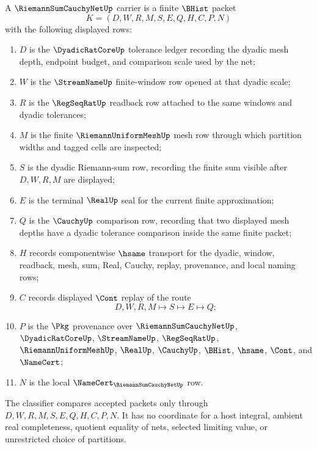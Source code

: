 \begin{definition}
\label{def:riemann-sum-cauchy-net-carrier}
A $\RiemannSumCauchyNetUp$ carrier is a finite $\BHist$ packet
$$
K=(D,W,R,M,S,E,Q,H,C,P,N)
$$
with the following displayed rows:
\begin{enumerate}
\item $D$ is the $\DyadicRatCoreUp$ tolerance ledger recording the dyadic mesh depth, endpoint budget, and comparison scale used by the net;
\item $W$ is the $\StreamNameUp$ finite-window row opened at that dyadic scale;
\item $R$ is the $\RegSeqRatUp$ readback row attached to the same windows and dyadic tolerances;
\item $M$ is the finite $\RiemannUniformMeshUp$ mesh row through which partition widths and tagged cells are inspected;
\item $S$ is the dyadic Riemann-sum row, recording the finite sum visible after $D,W,R,M$ are displayed;
\item $E$ is the terminal $\RealUp$ seal for the current finite approximation;
\item $Q$ is the $\CauchyUp$ comparison row, recording that two displayed mesh depths have a dyadic tolerance comparison inside the same finite packet;
\item $H$ records componentwise $\hsame$ transport for the dyadic, window, readback, mesh, sum, Real, Cauchy, replay, provenance, and local naming rows;
\item $C$ records displayed $\Cont$ replay of the route
$$
D,W,R,M \longmapsto S \longmapsto E \longmapsto Q ;
$$
\item $P$ is the $\Pkg$ provenance over $\RiemannSumCauchyNetUp$, $\DyadicRatCoreUp$, $\StreamNameUp$, $\RegSeqRatUp$, $\RiemannUniformMeshUp$, $\RealUp$, $\CauchyUp$, $\BHist$, $\hsame$, $\Cont$, and $\NameCert$;
\item $N$ is the local $\NameCert_{\RiemannSumCauchyNetUp}$ row.
\end{enumerate}
The classifier compares accepted packets only through $D,W,R,M,S,E,Q,H,C,P,N$. It has no coordinate for a host integral, ambient real completeness, quotient equality of nets, selected limiting value, or unrestricted choice of partitions.
\end{definition}

